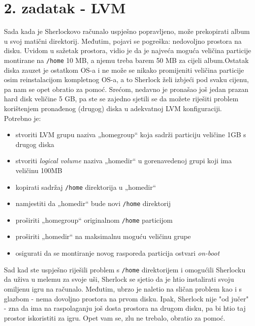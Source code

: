 \documentclass[12pt,a4paper]{article}
\begin{document}

\newpage


\section*{2. zadatak - LVM}

Sada kada je Sherlockovo računalo uspješno popravljeno, može prekopirati album u svoj matični direktorij\footnotemark[1]. Međutim, pojavi se pogreška: nedovoljno prostora na disku. Uvidom u sažetak prostora, vidio je da je najveća moguća veličina particije montirane na \texttt{/home} 10 MB, a njemu treba barem 50 MB za cijeli album.\footnotemark[2] Ostatak diska zauzet je ostatkom OS-a i ne može se nikako promijeniti veličina particije osim reinstalacijom kompletnog OS-a, a to Sherlock želi izbjeći pod svaku cijenu, pa nam se opet obratio za pomoć. Srećom, nedavno je pronašao još jedan prazan hard disk veličine 5 GB, pa ste se zajedno sjetili se da možete riješiti problem korištenjem pronađenog (drugog) diska u adekvatnoj LVM konfiguraciji. \\

Potrebno je:
\begin{itemize}
	\item stvoriti LVM grupu naziva „homegroup“ koja sadrži particiju veličine 1GB s drugog diska
	\item stvoriti \textit{logical volume} naziva „homedir“ u gorenavedenoj grupi koji ima veličinu 100MB
	\item kopirati sadržaj \texttt{/home} direktorija u „homedir“
	\item namjestiti da „homedir“ bude novi \texttt{/home} direktorij
	\item proširiti „homegroup“ originalnom \texttt{/home} particijom
	\item proširiti „homedir“ na maksimalnu moguću veličinu grupe
	\item osigurati da se montiranje novog rasporeda particija ostvari \textit{on-boot} \\
\end{itemize}

Sad kad ste uspješno riješili problem s \texttt{/home} direktorijem i omogućili Sherlocku da uživa u melemu za svoje uši, Sherlock se sjetio da je htio instalirati svoju omiljenu igru na računalo. Međutim, ubrzo je naletio na sličan problem kao i s glazbom - nema dovoljno prostora na prvom disku. Ipak, Sherlock nije "od jučer" - zna da ima na raspolaganju još dosta prostora na drugom disku, pa bi htio taj prostor iskoristiti za igru. Opet vam se, zlu ne trebalo, obratio za pomoć. \\
\end{document}
